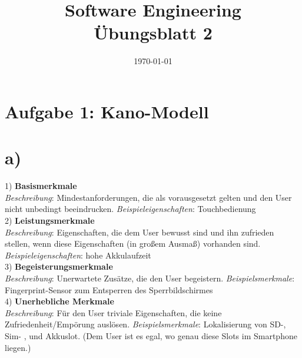 \documentclass[12pt,pdftex,a4paper]{article}
\title{\vspace{-1cm} Software Engineering \\ Übungsblatt 2}
\date{\today}
\begin{document}
\setlength{\parindent}{0pt}
\maketitle
\thispagestyle{fancy}




\section*{Aufgabe 1: Kano-Modell}

\section*{a) }
1) \textbf{Basismerkmale} \\
\textit{Beschreibung}: Mindestanforderungen, die als vorausgesetzt gelten und den User nicht unbedingt beeindrucken.\newline
\textit{Beispieleigenschaften}: Touchbedienung\\

2) \textbf{Leistungsmerkmale}\\
\textit{Beschreibung}: Eigenschaften, die dem User bewusst sind und ihn zufrieden stellen, wenn diese Eigenschaften (in großem Ausmaß) vorhanden sind. \newline
\textit{Beispieleigenschaften}: hohe Akkulaufzeit\\

3) \textbf{Begeisterungsmerkmale}\\
\textit{Beschreibung}: Unerwartete Zusätze, die den User begeistern.\newline
\textit{Beispielsmerkmale}: Fingerprint-Sensor zum Entsperren des Sperrbildschirmes\\

4) \textbf{Unerhebliche Merkmale}\\
\textit{Beschreibung}: Für den User triviale Eigenschaften, die keine Zufriedenheit/Empörung auslösen.\newline
\textit{Beispielsmerkmale}: Lokalisierung von SD-, Sim- , und Akkuslot. (Dem User ist es egal, wo genau diese Slots im Smartphone liegen.)\\
\end{document}
